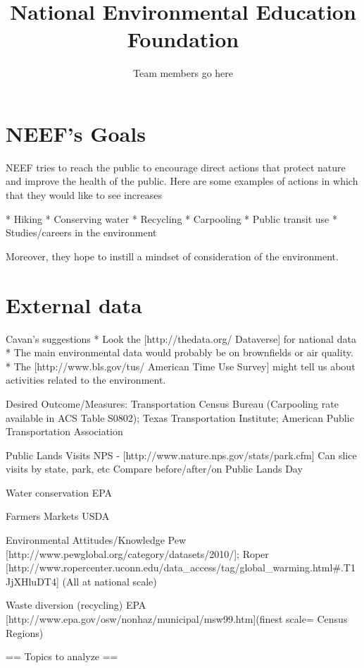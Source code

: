 \documentclass{article}
\title{National Environmental Education Foundation}
\author{Team members go here}
\begin{document}
\maketitle
{}

\section{NEEF's Goals}
NEEF tries to reach the public to encourage direct actions that protect nature and improve the health of the public. Here are some examples of actions in which that they would like to see increases

* Hiking
* Conserving water
* Recycling
* Carpooling
* Public transit use
* Studies/careers in the environment

Moreover, they hope to instill a mindset of consideration of the environment.

\section{External data}
Cavan's suggestions
* Look the [http://thedata.org/ Dataverse] for national data
* The main environmental data would probably be on brownfields or air quality.
* The [http://www.bls.gov/tus/ American Time Use Survey] might tell us about activities related to the environment.


Desired Outcome/Measures:
Transportation
Census Bureau (Carpooling rate available in ACS Table S0802); Texas Transportation Institute; American Public Transportation Association
 
Public Lands Visits
 NPS - [http://www.nature.nps.gov/stats/park.cfm]
Can slice visits by state, park, etc
Compare before/after/on Public Lands Day


Water conservation
EPA
 
Farmers Markets
USDA
 
Environmental Attitudes/Knowledge
Pew [http://www.pewglobal.org/category/datasets/2010/]; Roper [http://www.ropercenter.uconn.edu/data_access/tag/global_warming.html#.T1JjXHluDT4] (All at national scale)
 
Waste diversion (recycling)
EPA [http://www.epa.gov/osw/nonhaz/municipal/msw99.htm](finest scale= Census Regions)

== Topics to analyze ==
\end{document}
